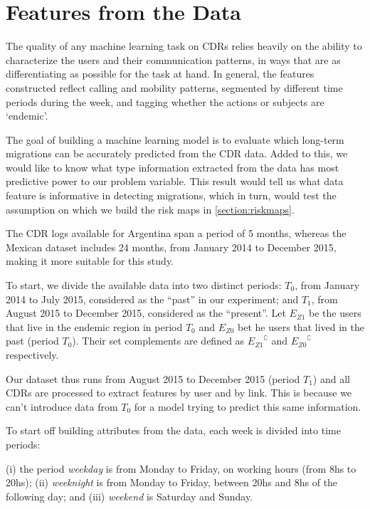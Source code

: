 \newpage


\section{Features from the Data}

The quality of any machine learning task on CDRs relies heavily on the ability to characterize the users and their communication patterns, in ways that are as differentiating as possible for the task at hand.
In general, the features constructed reflect calling and mobility patterns,
segmented by different time periods during the week, and tagging whether the actions or subjects are `endemic'.

The goal of building a machine learning model is to evaluate which long-term migrations can be accurately predicted from the CDR data. Added to this, we would like to know what type information extracted from the data has most predictive power to our problem variable. This result would tell us what data feature is informative in detecting migrations, which in turn, would test the assumption on which we build the risk maps in \cref{section:riskmaps}.

The CDR logs available for Argentina span a period of 5 months,
whereas the Mexican dataset includes 24 months, from January 2014 to December 2015, making it more suitable for this study.

To start, we divide the available data into two distinct periods:
$T_0$, from January 2014 to July 2015, considered as the ``past'' in our experiment;
and $T_1$, from August 2015 to December 2015, considered as the ``present''. Let $E_{Z1}$ be the users that live in the endemic region in period $T_0$
and  $E_{Z0}$ bet he users that lived in the past (period $T_0$). Their set complements are defined as ${ E_{Z1} }^{\complement}$ and ${ E_{Z0} }^{\complement}$ respectively.

Our dataset thus runs from August 2015 to December 2015 (period $T_1$) and all CDRs are processed to extract features by user and by link. This is because we can't introduce data from $T_0$ for a model trying to predict this same information.

To start off building attributes from the data, each week is divided into time periods:
\begin{definition}\label{def:week-periods}

	(i) the period \textit{weekday} is from Monday to Friday, on working hours (from 8hs to 20hs); (ii) \textit{weeknight} is from Monday to Friday, between 20hs and 8hs of the following day;
	and (iii) \textit{weekend} is Saturday and Sunday.
\end{definition}


